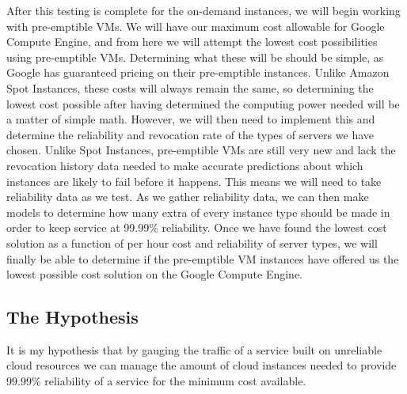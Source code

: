 \documentclass[thesis,proposal]{umassthesis}  %
\begin{document}
	After this testing is complete for the on-demand instances, we will begin working with pre-emptible VMs. We will have our maximum cost allowable for Google Compute Engine, and from here we will attempt the lowest cost possibilities using pre-emptible VMs. Determining what these will be should be simple, as Google has guaranteed pricing on their pre-emptible instances. Unlike Amazon Spot Instances, these costs will always remain the same, so determining the lowest cost possible after having determined the computing power needed will be a matter of simple math. However, we will then need to implement this and determine the reliability and revocation rate of the types of servers we have chosen. Unlike Spot Instances, pre-emptible VMs are still very new and lack the revocation history data needed to make accurate predictions about which instances are likely to fail before it happens. This means we will need to take reliability data as we test. As we gather reliability data, we can then make models to determine how many extra of every instance type should be made in order to keep service at 99.99\% reliability. Once we have found the lowest cost solution as a function of per hour cost and reliability of server types, we will finally be able to determine if the pre-emptible VM instances have offered us the lowest possible cost solution on the Google Compute Engine.
    
\subsection{The Hypothesis}
It is my hypothesis that by gauging the traffic of a service built on unreliable cloud resources we can manage the amount of cloud instances needed to provide 99.99\% reliability of a service for the minimum cost available. 
\end{document}
